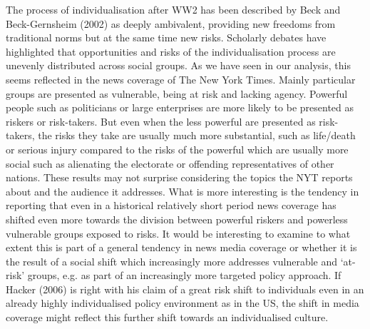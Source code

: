 The process of individualisation after WW2 has been described by Beck and Beck-Gernsheim (2002) as deeply ambivalent, providing new freedoms from traditional norms but at the same time new risks. Scholarly debates have highlighted that opportunities and risks of the individualisation process are unevenly distributed across social groups. As we have seen in our analysis, this seems reflected in the news coverage of The New York Times. Mainly particular groups are presented as vulnerable, being at risk and lacking agency. Powerful people such as politicians or large enterprises are more likely to be presented as riskers or risk-takers. But even when the less powerful are presented as risk-takers, the risks they take are usually much more substantial, such as life\slash death or serious injury compared to the risks of the powerful which are usually more social such as alienating the electorate or offending representatives of other nations.
These results may not surprise considering the topics the NYT reports about and the audience it addresses. What is more interesting is the tendency in reporting that even in a historical relatively short period news coverage has shifted even more towards the division between powerful riskers and powerless vulnerable groups exposed to risks. It would be interesting to examine to what extent this is part of a general tendency in news media coverage or whether it is the result of a social shift which increasingly more addresses vulnerable and `at-risk' groups, e.g. as part of an increasingly more targeted policy approach. If Hacker (2006) is right with his claim of a great risk shift to individuals even in an already highly individualised policy environment as in the US, the shift in media coverage might reflect this further shift towards an individualised culture. 




